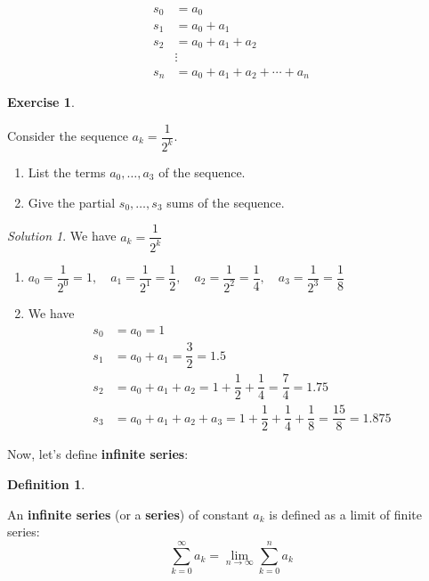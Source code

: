 \documentclass[
]{book}
\providecommand{\tightlist}{%
  \setlength{\itemsep}{0pt}\setlength{\parskip}{0pt}}
\theoremstyle{definition}
\newtheorem{definition}{Definition}[chapter]
\theoremstyle{definition}
\theoremstyle{definition}
\newtheorem{exercise}{Exercise}[chapter]
\theoremstyle{definition}
\theoremstyle{remark}
\newtheorem*{solution}{Solution}
\begin{document}
\begin{align*}
s_0 &= a_0 \\
s_1 &= a_0 + a_1 \\
s_2 &= a_0 + a_1 + a_2 \\
& \vdots \\
s_n &= a_0 + a_1 + a_2 + \cdots + a_n
\end{align*}

\begin{exercise}
\protect\hypertarget{exr:unlabeled-div-171}{}\label{exr:unlabeled-div-171}

Consider the sequence \(a_k=\dfrac{1}{2^k}\).

\begin{enumerate}
\def\labelenumi{\alph{enumi}.}
\tightlist
\item
  List the terms \(a_0, \ldots, a_3\) of the sequence.
\item
  Give the partial \(s_0, \ldots, s_3\) sums of the sequence.
\end{enumerate}

\end{exercise}

\begin{solution}

We have \(a_k=\dfrac{1}{2^k}\)

\begin{enumerate}
\def\labelenumi{\alph{enumi}.}
\tightlist
\item
  \(a_0= \dfrac{1}{2^0}=1, \quad a_1=\dfrac{1}{2^1}=\dfrac{1}{2}, \quad a_2=\dfrac{1}{2^2}=\dfrac{1}{4}, \quad a_3=\dfrac{1}{2^3}=\dfrac{1}{8}\)
\item
  We have
  \begin{align*}
  s_0 &= a_0=1 \\
  s_1 &= a_0+a_1=\dfrac{3}{2}=1.5\\
  s_2 &= a_0 + a_1 + a_2 = 1+\dfrac{1}{2}+\dfrac{1}{4} =\dfrac{7}{4} =1.75\\
  s_3 &= a_0 + a_1 + a_2 +a_3 = 1+\dfrac{1}{2}+\dfrac{1}{4} +\dfrac{1}{8} =\dfrac{15}{8} = 1.875 
  \end{align*}
\end{enumerate}

\end{solution}

Now, let's define \textbf{infinite series}:

\begin{definition}
\protect\hypertarget{def:unlabeled-div-173}{}\label{def:unlabeled-div-173}

An \textbf{infinite series} (or a \textbf{series}) of constant \(a_k\) is defined as a limit of finite series: \[\sum_{k=0}^\infty a_k =\lim_{n\to \infty}\sum_{k=0}^na_k\]

\end{definition}
\end{document}
